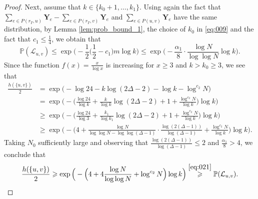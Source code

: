 \documentclass[10pt,a4paper]{amsart}
\begin{document}
\begin{proof}
Next, assume that $k\in \{k_0+1,\dots,k_1\}$. Using again the fact that
$\sum_{e\in P(r_T,u)}\mathbf{Y}_e - \sum_{e\in P(r_T,v)}\mathbf{Y}_e$ and
$\sum_{e\in P(u,v)}\mathbf{Y}_e $ have the same distribution, by Lemma \ref{lem:prob_bound_1},
the choice of $k_0$ in \eqref{eq:009} and the fact that $c_1\leqslant\frac{1}{4}$, we obtain that
\begin{equation}\label{eq:021}
\mathbb{P}(\mathcal{L}_{u,v}) \leqslant \exp\Big(-\frac{1}{2} \Big(\frac{1}{2}-c_1\Big)m\log k \Big)
\leqslant \exp\Big( -\frac{\alpha_1}{8} \cdot \frac{\log N}{\log\log N} \log k \Big).
\end{equation}
Since the function $f(x) = \frac{x}{\log x}$ is increasing for $x\geqslant3$ and $k>k_0\geqslant3$, we see that
\begin{align*}
\frac{h(\{u,v\})}{2} & =
\exp\big(-\log 24-k\log(2\Delta-2)-\log k - \log^{c_2}N\big) \\
& =\exp\Big(-\Big(\frac{\log 24}{\log k}+\frac{k}{\log k }\log(2\Delta-2)+1+
\frac{\log^{c_2}N}{\log k}\Big)  \log k \Big)\\
& \geqslant \exp\Big(-\Big(\frac{\log 24}{\log 3 }+\frac{k_1}{\log k_1 }\log(2\Delta-2)+1+
\frac{\log^{c_2}N}{\log k }\Big)  \log k \Big)\\
& \geqslant \exp\Big(-\Big(4+\frac{\log N }{\log\log N-\log\log(\Delta-1)}\cdot\frac{\log (2(\Delta-1))}{\log(\Delta-1)}+
\frac{\log^{c_2}N}{\log k}\Big)  \log k \Big).
\end{align*}
Taking $N_0$ sufficiently large and observing that $\frac{\log(2(\Delta-1))}{\log(\Delta-1)}\leqslant2$
and $\frac{\alpha_1}{8}>4$, we conclude that
\begin{equation}\label{eq:022}
\frac{h(\{u,v\})}{2}
\geqslant\exp\Big(-\Big(4+4\frac{\log N}{\log\log N}+\log^{c_2}N\Big)\log k\Big)
\stackrel{\eqref{eq:021}}{\geqslant}\mathbb{P}(\mathcal{L}_{u,v}).
\end{equation}


\end{proof}
\end{document}

